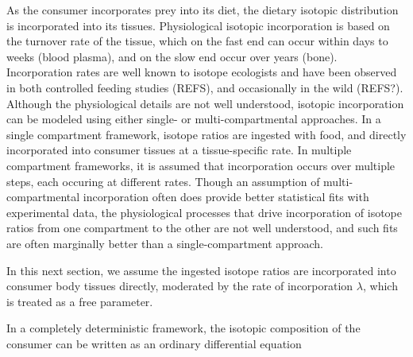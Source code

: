 \documentclass[11pt]{article}
\begin{document}
As the consumer incorporates prey into its diet, the dietary isotopic distribution is incorporated into its tissues.
Physiological isotopic incorporation is based on the turnover rate of the tissue, which on the fast end can occur within days to weeks (blood plasma), and on the slow end occur over years (bone).
Incorporation rates are well known to isotope ecologists and have been observed in both controlled feeding studies (REFS), and occasionally in the wild (REFS?).
Although the physiological details are not well understood, isotopic incorporation can be modeled using either single- or multi-compartmental approaches.
In a single compartment framework, isotope ratios are ingested with food, and directly incorporated into consumer tissues at a tissue-specific rate.
In multiple compartment frameworks, it is assumed that incorporation occurs over multiple steps, each occuring at different rates.
Though an assumption of multi-compartmental incorporation often does provide  better statistical fits with experimental data, the physiological processes that drive incorporation of isotope ratios from one compartment to the other are not well understood, and such fits are often marginally better than a single-compartment approach.

In this next section, we assume the ingested isotope ratios are incorporated into consumer body tissues directly, moderated by the rate of incorporation $\lambda$, which is treated as a free parameter.





In a completely deterministic framework, the isotopic composition of the consumer can be written as an ordinary differential equation
\end{document}
